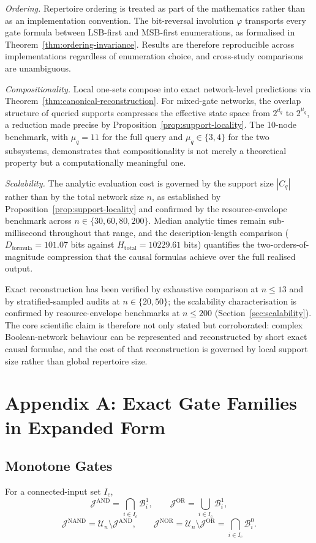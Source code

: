 \documentclass[11pt]{article}
\theoremstyle{definition}
\newcommand{\U}{\mathcal{U}_n}
\newcommand{\Ic}{I_c}
\newcommand{\J}{\mathcal{J}}
\newcommand{\Band}[2]{\mathcal{B}_{#1}^{#2}}
\begin{document}
\emph{Ordering.} Repertoire ordering is treated as part of the mathematics rather than as an implementation convention. The bit-reversal involution \(\varphi\) transports every gate formula between LSB-first and MSB-first enumerations, as formalised in Theorem~\ref{thm:ordering-invariance}. Results are therefore reproducible across implementations regardless of enumeration choice, and cross-study comparisons are unambiguous.

\emph{Compositionality.} Local one-sets compose into exact network-level predictions via Theorem~\ref{thm:canonical-reconstruction}. For mixed-gate networks, the overlap structure of queried supports compresses the effective state space from \(2^{d_q}\) to \(2^{\mu_q}\), a reduction made precise by Proposition~\ref{prop:support-locality}. The 10-node benchmark, with \(\mu_q=11\) for the full query and \(\mu_q\in\{3,4\}\) for the two subsystems, demonstrates that compositionality is not merely a theoretical property but a computationally meaningful one.

\emph{Scalability.} The analytic evaluation cost is governed by the support size \(|C_q|\) rather than by the total network size \(n\), as established by Proposition~\ref{prop:support-locality} and confirmed by the resource-envelope benchmark across \(n\in\{30,60,80,200\}\). Median analytic times remain sub-millisecond throughout that range, and the description-length comparison (\(D_{\mathrm{formula}}=101.07\) bits against \(H_{\mathrm{total}}=10229.61\) bits) quantifies the two-orders-of-magnitude compression that the causal formulas achieve over the full realised output.

Exact reconstruction has been verified by exhaustive comparison at $n\leq 13$ and by stratified-sampled audits at $n\in\{20,50\}$; the scalability characterisation is confirmed by resource-envelope benchmarks at $n\leq 200$ (Section~\ref{sec:scalability}). The core scientific claim is therefore not only stated but corroborated: complex Boolean-network behaviour can be represented and reconstructed by short exact causal formulae, and the cost of that reconstruction is governed by local support size rather than global repertoire size.

\appendix

\section{Appendix A: Exact Gate Families in Expanded Form}
\subsection{Monotone Gates}
For a connected-input set \(\Ic\),
\[
\J^{\mathrm{AND}}=\bigcap_{i\in\Ic}\Band{i}{1},
\qquad
\J^{\mathrm{OR}}=\bigcup_{i\in\Ic}\Band{i}{1},
\]
\[
\J^{\mathrm{NAND}}=\U\setminus\J^{\mathrm{AND}},
\qquad
\J^{\mathrm{NOR}}=\U\setminus\J^{\mathrm{OR}}=\bigcap_{i\in\Ic}\Band{i}{0}.
\]
\end{document}
